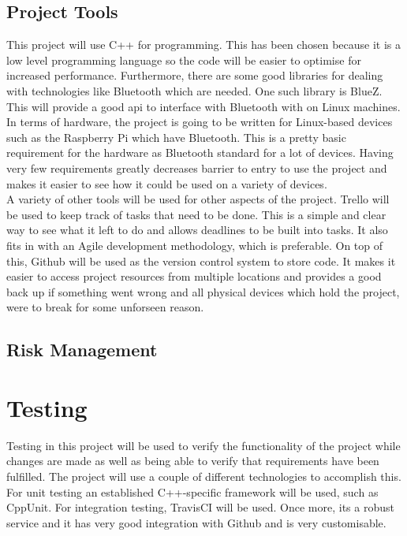 \documentclass{report}
\begin{document}
\section*{Project Tools}

This project will use C++ for programming. This has been chosen because it is a low level programming language 
so the code will be easier to optimise for increased performance. Furthermore, there are some good libraries 
for dealing with technologies like Bluetooth which are needed. One such library is BlueZ\cite{bluez}. This will 
provide a good api to interface with Bluetooth with on Linux machines.
\bigskip\\
In terms of hardware, the project is going to be written for Linux-based devices such as the Raspberry Pi which have 
Bluetooth. This is a pretty basic requirement for the hardware as Bluetooth standard for a lot of devices. Having 
very few requirements greatly decreases barrier to entry to use the project and makes it easier to see how it could 
be used on a variety of devices. 
\bigskip\\
A variety of other tools will be used for other aspects of the project. Trello will be used to keep track of tasks that 
need to be done. This is a simple and clear way to see what it left to do and allows deadlines to be built into tasks. It 
also fits in with an Agile development methodology, which is preferable. On top of this, Github will be used as the version 
control system to store code. It makes it easier to access project resources from multiple locations and provides a good back 
up if something went wrong and all physical devices which hold the project, were to break for some unforseen reason. 


\section*{Risk Management}

\chapter*{Testing}

Testing in this project will be used to verify the functionality of the project while changes are made as 
well as being able to verify that requirements have been fulfilled. The project will use a couple of different 
technologies to accomplish this. For unit testing an established C++-specific framework will be used, such 
as CppUnit.
For integration testing, TravisCI will be used. Once more, its a robust service and it has very good integration with Github and 
is very customisable. 
\end{document}
